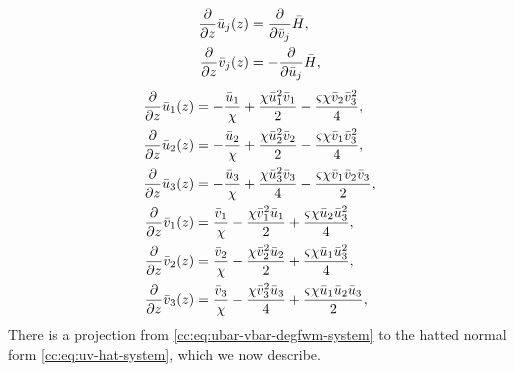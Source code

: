 \documentclass[11pt,a4paper]{article}
\numberwithin{equation}{section}
\begin{document}
\begin{align}
  \frac{\partial}{\partial z} \bar{u}_j(z) &=  \frac{\partial}{\partial \bar{v}_j} \bar{H}, \notag \\
  \frac{\partial}{\partial z} \bar{v}_j(z) &=  -\frac{\partial}{\partial \bar{u}_j} \bar{H}, \notag
\end{align}
\begin{align}
  \frac{\partial}{\partial z} \bar{u}_1(z) &=  - \frac{\bar{u}_1}{\chi} + \frac{\chi \bar{u}_1^{2} \bar{v}_1}{2} - \frac{\varsigma \chi \bar{v}_2 \bar{v}_3^{2}}{4}, \notag \\
  \frac{\partial}{\partial z} \bar{u}_2(z) &=  - \frac{\bar{u}_2}{\chi} + \frac{\chi \bar{u}_2^{2} \bar{v}_2}{2} - \frac{\varsigma \chi \bar{v}_1 \bar{v}_3^{2}}{4}, \notag \\
  \frac{\partial}{\partial z} \bar{u}_3(z) &=  - \frac{\bar{u}_3}{\chi} + \frac{\chi \bar{u}_3^{2} \bar{v}_3}{4} - \frac{\varsigma \chi \bar{v}_1 \bar{v}_2 \bar{v}_3}{2}, \notag \\
  \frac{\partial}{\partial z} \bar{v}_1(z) &= \frac{\bar{v}_1}{\chi} - \frac{\chi \bar{v}_1^{2} \bar{u}_1}{2} + \frac{\varsigma \chi \bar{u}_2 \bar{u}_3^{2}}{4}, \notag \\
  \frac{\partial}{\partial z} \bar{v}_2(z) &= \frac{\bar{v}_2}{\chi} - \frac{\chi \bar{v}_2^{2} \bar{u}_2}{2} + \frac{\varsigma \chi \bar{u}_1 \bar{u}_3^{2}}{4}, \notag \\
  \frac{\partial}{\partial z} \bar{v}_3(z) &= \frac{\bar{v}_3}{\chi} - \frac{\chi \bar{v}_3^{2} \bar{u}_3}{4} + \frac{\varsigma \chi \bar{u}_1 \bar{u}_2 \bar{u}_3}{2}, \label{cc:eq:ubar-vbar-degfwm-system}
\end{align}
There is a projection from \eqref{cc:eq:ubar-vbar-degfwm-system} to the hatted normal form \eqref{cc:eq:uv-hat-system}, which we now describe.
\end{document}
